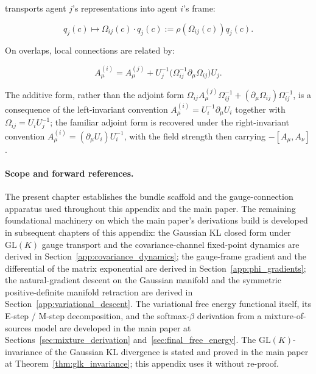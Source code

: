 \documentclass[twoside,11pt]{article}
\begin{document}
transports agent $j$'s representations into agent $i$'s frame:

\begin{equation}
q_j(c) \mapsto \Omega_{ij}(c) \cdot q_j(c) := \rho(\Omega_{ij}(c)) q_j(c).
\end{equation}

On overlaps, local connections are related by:

\begin{equation}
A^{(i)}_\mu = A^{(j)}_\mu + U_j^{-1}\bigl(\Omega_{ij}^{-1} \partial_\mu \Omega_{ij}\bigr) U_j.
\end{equation}

The additive form, rather than the adjoint form $\Omega_{ij} A^{(j)}_\mu \Omega_{ij}^{-1} + (\partial_\mu \Omega_{ij}) \Omega_{ij}^{-1}$, is a consequence of the left-invariant convention $A^{(i)}_\mu = U_i^{-1}\partial_\mu U_i$ together with $\Omega_{ij} = U_i U_j^{-1}$; the familiar adjoint form is recovered under the right-invariant convention $A^{(i)}_\mu = (\partial_\mu U_i) U_i^{-1}$, with the field strength then carrying $-[A_\mu, A_\nu]$.

\paragraph{Scope and forward references.} The present chapter establishes the bundle scaffold and the gauge-connection apparatus used throughout this appendix and the main paper. The remaining foundational machinery on which the main paper's derivations build is developed in subsequent chapters of this appendix: the Gaussian KL closed form under $\mathrm{GL}(K)$ gauge transport and the covariance-channel fixed-point dynamics are derived in Section~\ref{app:covariance_dynamics}; the gauge-frame gradient and the differential of the matrix exponential are derived in Section~\ref{app:phi_gradients}; the natural-gradient descent on the Gaussian manifold and the symmetric positive-definite manifold retraction are derived in Section~\ref{app:variational_descent}. The variational free energy functional itself, its E-step / M-step decomposition, and the softmax-$\beta$ derivation from a mixture-of-sources model are developed in the main paper at Sections~\ref{sec:mixture_derivation} and~\ref{sec:final_free_energy}. The $\mathrm{GL}(K)$-invariance of the Gaussian KL divergence is stated and proved in the main paper at Theorem~\ref{thm:glk_invariance}; this appendix uses it without re-proof.
\end{document}
